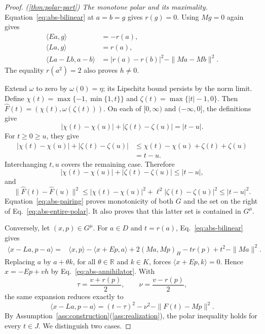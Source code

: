 \documentclass[11pt]{article}
\newcommand{\R}{\mathbb R}
\newcommand{\pair}[2]{\langle #1,#2\rangle}
\theoremstyle{definition}
\theoremstyle{remark}
\begin{document}
\begin{proof}
\noindent\textit{\textup{(\ref{thm:polar-part})} The monotone polar and its maximality.}
Equation~\eqref{eq:abs-bilinear} at $a=b=g$ gives $r(g)=0$.
Using $Mg=0$ again gives
\begin{equation}
\begin{aligned}
\pair{Ea}{g}&=-r(a),\\
\pair{La}{g}&=r(a),\\
\pair{La-Lb}{a-b}&=|r(a)-r(b)|^2-\|Ma-Mb\|^2.
\end{aligned}
\label{eq:abs-pairing}
\end{equation}
The equality $r(a^2)=2$ also proves $h\ne0$.

Extend $\omega$ to zero by $\omega(0)=\eta$; its Lipschitz bound
persists by the norm limit. Define
$\chi(t)=\max\{-1,\min\{1,t\}\}$ and
$\zeta(t)=\max\{|t|-1,0\}$. Then
$\widehat F(t)=(\chi(t),\omega(\zeta(t)))$.
On each of $[0,\infty)$ and $(-\infty,0]$, the definitions give
\[
|\chi(t)-\chi(u)|+|\zeta(t)-\zeta(u)|=|t-u|.
\]
For $t\ge0\ge u$, they give
\[
\begin{aligned}
|\chi(t)-\chi(u)|+|\zeta(t)-\zeta(u)|
&\le \chi(t)-\chi(u)+\zeta(t)+\zeta(u)\\
&=t-u.
\end{aligned}
\]
Interchanging $t,u$ covers the remaining case. Therefore
\[
|\chi(t)-\chi(u)|+|\zeta(t)-\zeta(u)|\le|t-u|,
\]
and
\[
\|\widehat F(t)-\widehat F(u)\|^2
\le|\chi(t)-\chi(u)|^2+\ell^2|\zeta(t)-\zeta(u)|^2
\le|t-u|^2.
\]
Equation~\eqref{eq:abs-pairing} proves monotonicity of both $G$
and the set on the right of Eq.~\eqref{eq:abs-entire-polar}.
It also proves that this latter set is contained in $G^\mu$.

Conversely, let $(x,p)\in G^\mu$. For $a\in D$ and $t=r(a)$,
Eq.~\eqref{eq:abs-bilinear} gives
\begin{align*}
\pair{x-La}{p-a}
={}&\pair{x}{p}-\pair{x+Ep}{a}
       +2(Ma,Mp)_H-t r(p)+t^2-\|Ma\|^2.
\end{align*}
Replacing $a$ by $a+\theta k$, for all $\theta\in\R$ and
$k\in K$, forces $\pair{x+Ep}{k}=0$. Hence
$x=-Ep+v h$ by Eq.~\eqref{eq:abs-annihilator}. With
\[
\tau=\frac{v+r(p)}2,\qquad \nu=\frac{v-r(p)}2,
\]
the same expansion reduces exactly to
\begin{equation}
\pair{x-La}{p-a}=(t-\tau)^2-\nu^2-\|F(t)-Mp\|^2.
\label{eq:abs-polar-square}
\end{equation}
By Assumption~\ref{ass:construction}\textup{(\ref{ass:realization})}, the polar inequality holds for every $t\in J$.
We distinguish two cases.


\end{proof}
\end{document}
